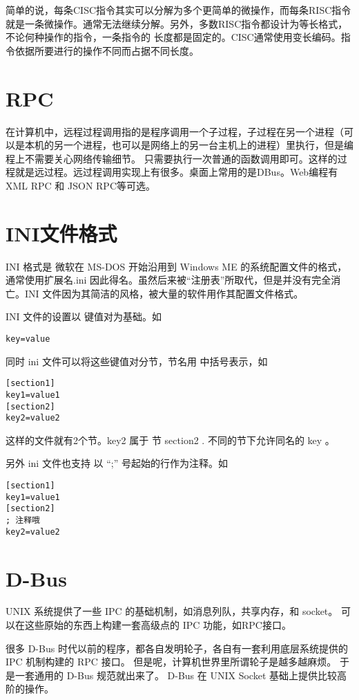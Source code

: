 简单的说，每条CISC指令其实可以分解为多个更简单的微操作，而每条RISC指令就是一条微操作。通常无法继续分解。另外，多数RISC指令都设计为等长格式，不论何种操作的指令，一条指令的
长度都是固定的。CISC通常使用变长编码。指令依据所要进行的操作不同而占据不同长度。

\section{RPC}\label{FAQ:RPC}

在计算机中，远程过程调用指的是程序调用一个子过程，子过程在另一个进程（可以是本机的另一个进程，也可以是网络上的另一台主机上的进程）里执行，但是编程上不需要关心网络传输细节。
只需要执行一次普通的函数调用即可。这样的过程就是远过程。远过程调用实现上有很多。桌面上常用的是DBus。Web编程有XML RPC 和 JSON RPC等可选。

\section{INI文件格式}\label{FAQ:INI}

INI 格式是 微软在 MS-DOS 开始沿用到 Windows ME 的系统配置文件的格式，通常使用扩展名.ini 因此得名。虽然后来被“注册表”所取代，但是并没有完全消亡。INI 文件因为其简洁的风格，被大量的软件用作其配置文件格式。

INI 文件的设置以 键值对为基础。如

\begin{verbatim}
key=value
\end{verbatim}

同时 ini 文件可以将这些键值对分节，节名用 中括号表示，如

\begin{verbatim}
[section1]
key1=value1
[section2]
key2=value2
\end{verbatim}

这样的文件就有2个节。key2 属于 节 section2 . 不同的节下允许同名的 key 。


另外 ini 文件也支持 以 “;” 号起始的行作为注释。如


\begin{verbatim}
[section1]
key1=value1
[section2]
; 注释哦
key2=value2
\end{verbatim}


\section{D-Bus}\label{FAQ:dbus}

UNIX 系统提供了一些 IPC 的基础机制，如消息列队，共享内存，和 socket。 可以在这些原始的东西上构建一套高级点的 IPC 功能，如RPC接口。

很多 D-Bus 时代以前的程序，都各自发明轮子，各自有一套利用底层系统提供的 IPC 机制构建的 RPC 接口。 但是呢，计算机世界里所谓轮子是越多越麻烦。 于是一套通用的 D-Bus 规范就出来了。 D-Bus 在 UNIX Socket 基础上提供比较高阶的操作。

